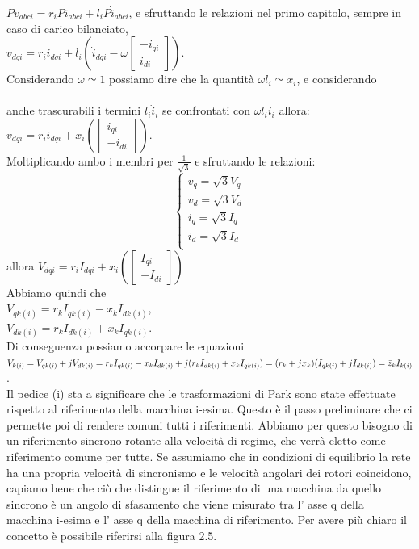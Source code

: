 \documentclass[Lau,noexaminfo]{sapthesis}
\begin{document}
	$Pv_{abci}=r_iPi_{abci}+l_iP\dot{i}_{abci}$, e sfruttando le relazioni nel primo capitolo, sempre in caso di carico bilanciato,\\ $v_{dqi}=r_ii_{dqi}+l_i(\dot{i}_{dqi}-\omega\begin{bmatrix}
	-i_{qi}\\
	i_{di}
	\end{bmatrix})$.\\
	Considerando $\omega \simeq 1$ possiamo dire che la quantità $\omega l_i \simeq x_i$, e considerando\\\\ anche trascurabili i termini $l_i\dot{i}_i$ se confrontati con $\omega l_ii_i$ allora:\\
	$v_{dqi}=r_ii_{dqi}+x_i(\begin{bmatrix}
	i_{qi}\\
	-i_{di}
	\end{bmatrix})$.\\ 
	Moltiplicando ambo i membri per $\frac{1}{\sqrt{3}}$ e sfruttando le relazioni:\\
	\[
	\begin{cases}
	v_q=\sqrt{3}V_q\\
	v_d=\sqrt{3}V_d\\
	i_q=\sqrt{3}I_q\\
	i_d=\sqrt{3}I_d\\
	\end{cases}
	\]
	allora $V_{dqi}=r_iI_{dqi}+x_i(\begin{bmatrix}
	I_{qi}\\
	-I_{di}
	\end{bmatrix})$\\
	Abbiamo quindi che\\
	$V_{qk(i)}=r_kI_{qk(i)}-x_kI_{dk(i)}$,\\
	$V_{dk(i)}=r_kI_{dk(i)}+x_kI_{qk(i)}$.\\
	Di conseguenza possiamo accorpare le equazioni \\
	$\bar{V}_{k(i)}=V_{qk(i)}+jV_{dk(i)}=r_kI_{qk(i)}-x_kI_{dk(i)}+j(r_kI_{dk(i)}+x_kI_{qk(i)})=\\
	(r_k+jx_k)(I_{qk(i)}+jI_{dk(i)})=\bar{z}_k\bar{I}_{k(i)}$.\\
	Il pedice (i) sta a significare che le trasformazioni di Park sono state effettuate rispetto al riferimento della macchina i-esima. Questo è il passo preliminare che ci permette poi di rendere comuni tutti i riferimenti. Abbiamo per questo bisogno di un riferimento sincrono rotante alla velocità di regime, che verrà eletto come riferimento comune per tutte. Se assumiamo che in condizioni di equilibrio la rete ha una propria velocità di sincronismo e le velocità angolari dei rotori coincidono, capiamo bene che ciò che distingue il riferimento di una macchina da quello sincrono è un angolo di sfasamento che viene misurato tra l' asse q della macchina i-esima e l' asse q della macchina di riferimento. Per avere più chiaro il concetto è possibile riferirsi alla figura 2.5.
\end{document}
